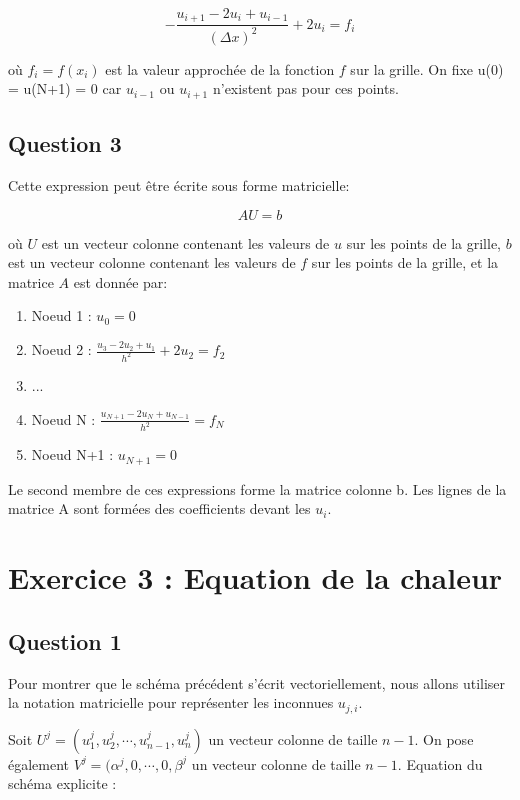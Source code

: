 \documentclass{article}
\begin{document}
$$-\frac{u_{i+1}-2u_i+u_{i-1}}{(\Delta x)^2} + 2u_i = f_i$$

où $f_i = f(x_i)$ est la valeur approchée de la fonction $f$ sur la grille. On fixe u(0) = u(N+1) = 0 car $u_{i-1}$ ou $u_{i+1}$ n'existent pas pour ces points.

\subsection{Question 3}

Cette expression peut être écrite sous forme matricielle:

$$AU = b$$

où $U$ est un vecteur colonne contenant les valeurs de $u$ sur les points de la grille, $b$ est un vecteur colonne contenant les valeurs de $f$ sur les points de la grille, et la matrice $A$ est donnée par:

\begin{enumerate}
    \item Noeud 1 : $u_{0}=0$
    \item Noeud 2 : $\frac{u_3 - 2u_2 + u_1}{h^2} + 2u_2 = f_2$
    \item ...
    \item Noeud N : $\frac{u_{N+1} - 2u_N + u_{N-1}}{h^2}=f_N$
    \item Noeud N+1 : $u_{N+1}=0$
\end{enumerate}

Le second membre de ces expressions forme la matrice colonne b. Les lignes de la  matrice A sont formées des coefficients devant les $u_i$.

\section{Exercice 3 : Equation de la chaleur}
\subsection{Question 1}

Pour montrer que le schéma précédent s'écrit vectoriellement, nous allons utiliser la notation matricielle pour représenter les inconnues $u_{j,i}$.

Soit $U^j = (u_{1}^j, u_{2}^j, \cdots, u_{n-1}^j, u_{n}^j)$ un vecteur colonne de taille $n-1$. 
\newline On pose également $V^j = (\alpha^j, 0, \cdots, 0, \beta^j$ un vecteur colonne de taille $n-1$.
\newline
\newline
Equation du schéma explicite :
\end{document}
